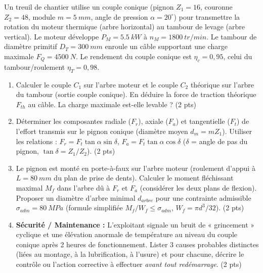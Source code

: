 \documentclass[11pt]{article}
\begin{document}
\begin{exercice}
Un treuil de chantier utilise un couple conique (pignon $Z_1 = 16$, couronne $Z_2 = 48$, module $m = \SI{5}{mm}$, angle de pression $\alpha = 20^\circ$) pour transmettre la rotation du moteur thermique (arbre horizontal) au tambour de levage (arbre vertical). Le moteur développe $P_M = \SI{5,5}{kW}$ à $n_M = \SI{1800}{tr/min}$. Le tambour de diamètre primitif $D_T = \SI{300}{mm}$ enroule un câble supportant une charge maximale $F_Q = \SI{4500}{N}$. Le rendement du couple conique est $\eta_c = 0,95$, celui du tambour/roulement $\eta_T = 0,98$.
\begin{enumerate}
    \item Calculer le couple $C_1$ sur l'arbre moteur et le couple $C_2$ théorique sur l'arbre du tambour (sortie couple conique). En déduire la force de traction théorique $F_{th}$ au câble. La charge maximale est-elle levable ? (2 pts)
    \item Déterminer les composantes radiale ($F_r$), axiale ($F_a$) et tangentielle ($F_t$) de l'effort transmis sur le pignon conique (diamètre moyen $d_m = m Z_1$). Utiliser les relations : $F_r = F_t \tan\alpha \sin\delta$, $F_a = F_t \tan\alpha \cos\delta$ ($\delta$ = angle de pas du pignon, $\tan\delta = Z_1/Z_2$). (2 pts)
    \item Le pignon est monté en porte-à-faux sur l'arbre moteur (roulement d'appui à $L = \SI{80}{mm}$ du plan de prise de dents). Calculer le moment fléchissant maximal $M_f$ dans l'arbre dû à $F_r$ et $F_a$ (considérer les deux plans de flexion). Proposer un diamètre d'arbre minimal $d_{arbre}$ pour une contrainte admissible $\sigma_{adm} = \SI{80}{MPa}$ (formule simplifiée $M_f / W_f \le \sigma_{adm}$, $W_f = \pi d^3/32$). (2 pts)
    \item \textbf{Sécurité / Maintenance :} L'exploitant signale un bruit de « grincement » cyclique et une élévation anormale de température au niveau du couple conique après 2 heures de fonctionnement. Lister 3 causes probables distinctes (liées au montage, à la lubrification, à l'usure) et pour chacune, décrire le contrôle ou l'action corrective à effectuer \textit{avant tout redémarrage}. (2 pts)
\end{enumerate}
\end{exercice}
\end{document}
